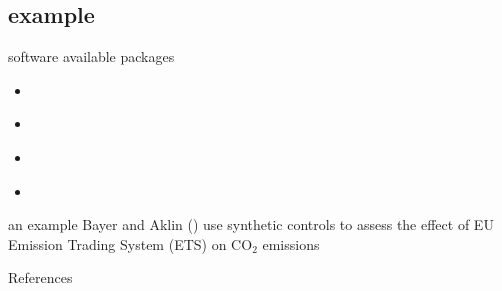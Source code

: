\documentclass[aspectratio=169]{beamer}
\begin{document}
	\subsection{example}
		\begin{frame}{software}
			available packages
			\begin{itemize}
				\item \href{https://cran.r-project.org/web/packages/Synth/index.html}{\underline{}}
				\item \href{https://github.com/synth-inference/synthdid}{\underline{}}
				\item \href{https://github.com/hollina/scul/}{\underline{}}
				\item \href{https://yiqingxu.org/software/gsynth/gsynth_examples.html}{\underline{}}
			\end{itemize}
		\end{frame}

		\begin{frame}{an example}
			Bayer and Aklin (\citeyear{Bayer2020}) use synthetic controls to assess the effect of EU Emission Trading System (ETS) on CO$_2$ emissions
			\begin{center}
			\end{center}
		\end{frame}

	\begin{frame}[t, allowframebreaks]{References}
	  \printbibliography
	\end{frame}
\end{document}
